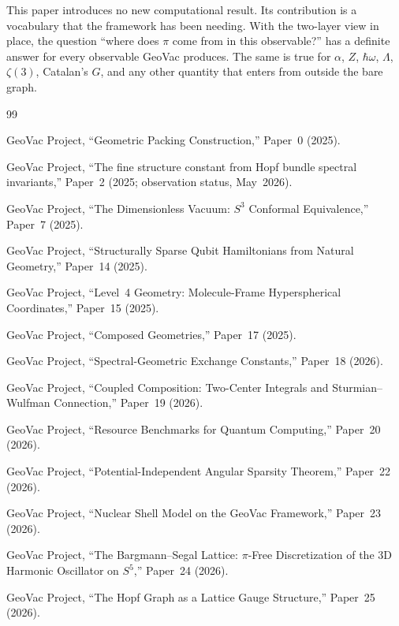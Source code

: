 \documentclass[11pt]{article}
\begin{document}
This paper introduces no new computational result.  Its contribution
is a vocabulary that the framework has been needing.  With the
two-layer view in place, the question ``where does $\pi$ come from
in this observable?'' has a definite answer for every observable
GeoVac produces.  The same is true for $\alpha$, $Z$, $\hbar\omega$,
$\Lambda$, $\zeta(3)$, Catalan's $G$, and any other quantity that
enters from outside the bare graph.

\begin{thebibliography}{99}

GeoVac Project, ``Geometric Packing Construction,'' Paper~0 (2025).

GeoVac Project, ``The fine structure constant from Hopf bundle
spectral invariants,'' Paper~2 (2025; observation status, May~2026).

GeoVac Project, ``The Dimensionless Vacuum: $S^3$ Conformal
Equivalence,'' Paper~7 (2025).

GeoVac Project, ``Structurally Sparse Qubit Hamiltonians from Natural
Geometry,'' Paper~14 (2025).

GeoVac Project, ``Level~4 Geometry: Molecule-Frame Hyperspherical
Coordinates,'' Paper~15 (2025).

GeoVac Project, ``Composed Geometries,'' Paper~17 (2025).

GeoVac Project, ``Spectral-Geometric Exchange Constants,'' Paper~18
(2026).

GeoVac Project, ``Coupled Composition: Two-Center Integrals and
Sturmian--Wulfman Connection,'' Paper~19 (2026).

GeoVac Project, ``Resource Benchmarks for Quantum Computing,''
Paper~20 (2026).

GeoVac Project, ``Potential-Independent Angular Sparsity Theorem,''
Paper~22 (2026).

GeoVac Project, ``Nuclear Shell Model on the GeoVac Framework,''
Paper~23 (2026).

GeoVac Project, ``The Bargmann--Segal Lattice: $\pi$-Free
Discretization of the 3D Harmonic Oscillator on $S^5$,'' Paper~24
(2026).

GeoVac Project, ``The Hopf Graph as a Lattice Gauge Structure,''
Paper~25 (2026).


\end{thebibliography}
\end{document}
